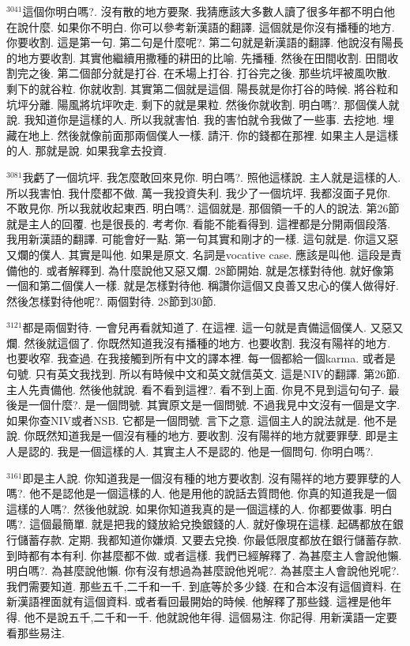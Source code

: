 \documentclass{book}
\begin{document}
$^{3041}$這個你明白嗎?.
沒有散的地方要聚.
我猜應該大多數人讀了很多年都不明白他在說什麼.
如果你不明白.
你可以參考新漢語的翻譯.
這個就是你沒有播種的地方.
你要收割.
這是第一句.
第二句是什麼呢?.
第二句就是新漢語的翻譯.
他說沒有陽長的地方要收割.
其實他繼續用撒種的耕田的比喻.
先播種.
然後在田間收割.
田間收割完之後.
第二個部分就是打谷.
在禾場上打谷.
打谷完之後.
那些坑坪被風吹散.
剩下的就谷粒.
你就收割.
其實第二個就是這個.
陽長就是你打谷的時候.
將谷粒和坑坪分離.
陽風將坑坪吹走.
剩下的就是果粒.
然後你就收割.
明白嗎?.
那個僕人就說.
我知道你是這樣的人.
所以我就害怕.
我的害怕就令我做了一些事.
去挖地.
埋藏在地上.
然後就像前面那兩個僕人一樣.
請汗.
你的錢都在那裡.
如果主人是這樣的人.
那就是說.
如果我拿去投資.

$^{3081}$我虧了一個坑坪.
我怎麼敢回來見你.
明白嗎?.
照他這樣說.
主人就是這樣的人.
所以我害怕.
我什麼都不做.
萬一我投資失利.
我少了一個坑坪.
我都沒面子見你.
不敢見你.
所以我就收起東西.
明白嗎?.
這個就是.
那個領一千的人的說法.
第26節就是主人的回覆.
也是很長的.
考考你.
看能不能看得到.
這裡都是分開兩個段落.
我用新漢語的翻譯.
可能會好一點.
第一句其實和剛才的一樣.
這句就是.
你這又惡又爛的僕人.
其實是叫他.
如果是原文.
名詞是vocative case.
應該是叫他.
這段是責備他的.
或者解釋到.
為什麼說他又惡又爛.
28節開始.
就是怎樣對待他.
就好像第一個和第二個僕人一樣.
就是怎樣對待他.
稱讚你這個又良善又忠心的僕人做得好.
然後怎樣對待他呢?.
兩個對待.
28節到30節.

$^{3121}$都是兩個對待.
一會兒再看就知道了.
在這裡.
這一句就是責備這個僕人.
又惡又爛.
然後就這個了.
你既然知道我沒有播種的地方.
也要收割.
我沒有陽祥的地方.
也要收窄.
我查過.
在我接觸到所有中文的譯本裡.
每一個都給一個karma.
或者是句號.
只有英文我找到.
所以有時候中文和英文就信英文.
這是NIV的翻譯.
第26節.
主人先責備他.
然後他就說.
看不看到這裡?.
看不到上面.
你見不見到這句句子.
最後是一個什麼?.
是一個問號.
其實原文是一個問號.
不過我見中文沒有一個是文字.
如果你查NIV或者NSB.
它都是一個問號.
言下之意.
這個主人的說法就是.
他不是說.
你既然知道我是一個沒有種的地方.
要收割.
沒有陽祥的地方就要罪孽.
即是主人是認的.
我是一個這樣的人.
其實主人不是認的.
他是一個問句.
你明白嗎?.

$^{3161}$即是主人說.
你知道我是一個沒有種的地方要收割.
沒有陽祥的地方要罪孽的人嗎?.
他不是認他是一個這樣的人.
他是用他的說話去質問他.
你真的知道我是一個這樣的人嗎?.
然後他就說.
如果你知道我真的是一個這樣的人.
你都要做事.
明白嗎?.
這個最簡單.
就是把我的錢放給兌換銀錢的人.
就好像現在這樣.
起碼都放在銀行儲蓄存款.
定期.
我都知道你嫌煩.
又要去兌換.
你最低限度都放在銀行儲蓄存款.
到時都有本有利.
你甚麼都不做.
或者這樣.
我們已經解釋了.
為甚麼主人會說他懶.
明白嗎?.
為甚麼說他懶.
你有沒有想過為甚麼說他兇呢?.
為甚麼主人會說他兇呢?.
我們需要知道.
那些五千,二千和一千.
到底等於多少錢.
在和合本沒有這個資料.
在新漢語裡面就有這個資料.
或者看回最開始的時候.
他解釋了那些錢.
這裡是他年得.
他不是說五千,二千和一千.
他就說他年得.
這個易注.
你記得.
用新漢語一定要看那些易注.
\end{document}
